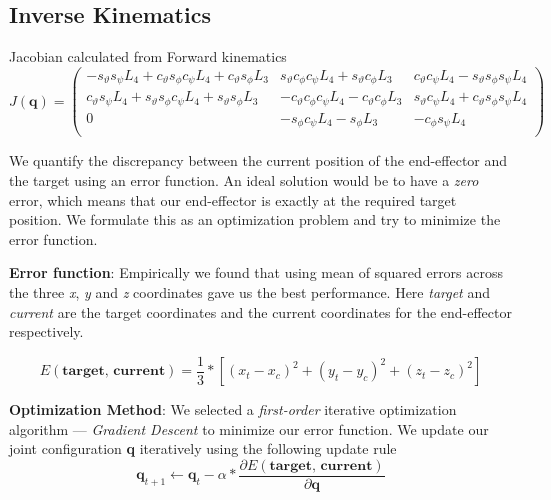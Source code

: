 \documentclass[11pt, a4paper]{article}
\begin{document}
    \subsection{Inverse Kinematics}
    Jacobian calculated from Forward kinematics
    $$
    J(\textbf{q}) =
        \begin{pmatrix}
           -s_{\vartheta}s_{\psi}L_4 + c_{\vartheta}s_{\phi}c_{\psi}L_4 + c_{\vartheta}s_{\phi}L_3 & 
            s_{\vartheta}c_{\phi}c_{\psi}L_4 + s_{\vartheta}c_{\phi}L_3 & 
            c_{\vartheta}c_{\psi}L_4 - s_{\vartheta}s_{\phi}s_{\psi}L_4\\

            c_{\vartheta}s_{\psi}L_4 + s_{\vartheta}s_{\phi}c_{\psi}L_4 + s_{\vartheta}s_{\phi}L_3 &
           -c_{\vartheta}c_{\phi}c_{\psi}L_4 - c_{\vartheta}c_{\phi}L_3 &
            s_{\vartheta}c_{\psi}L_4 + c_{\vartheta}s_{\phi}s_{\psi}L_4\\

            0 &
           -s_{\phi}c_{\psi}L_4 - s_{\phi}L_3 &
           -c_{\phi}s_{\psi}L_4\\
        \end{pmatrix}
    $$
    
    \par \noindent We quantify the discrepancy between the current position of the end-effector and the target using an error function. An ideal solution would be to have a \textit{zero} error, which means that our end-effector is exactly at the required target position. We formulate this as an optimization problem and try to minimize the error function. \cite{gradient_descent_ik}


    \textbf{Error function}: Empirically we found that using mean of squared errors across the three \textit{x}, \textit{y} and \textit{z} coordinates gave us the best performance. Here \textit{target} and \textit{current} are the target coordinates and the current coordinates for the end-effector respectively.

    $$
        E(\textbf{target, current}) = \frac{1}{3} * [(x_t - x_c )^2 + (y_t - y_c )^2 + (z_t - z_c )^2]
    $$
    
    \textbf{Optimization Method}: We selected a \textit{first-order} iterative optimization algorithm --- \textit{Gradient Descent} \cite{gradient_descent} to minimize our error function. We update our joint configuration \textbf{q} iteratively using the following update rule
    $$
        \textbf{q}_{t+1} \longleftarrow \textbf{q}_{t} - \alpha * \frac{\partial E(\textbf{target, current})}{\partial \textbf{q}}
    $$
    
\end{document}
